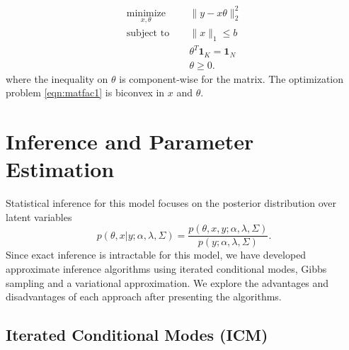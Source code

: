 \documentclass[11pt]{amsart}
\begin{document}
\begin{equation}\label{eqn:matfac1}
\begin{split}
\underset{x,\theta}{\text{minimize}} & \quad\ \| y - x\theta \|_2^2\\
\text{subject to} & \quad\ \|x\|_1 \leq b\\
& \quad\  \theta^T \mathbf{1}_K=\mathbf{1}_N\\
& \quad\  \theta \geq 0.
\end{split}
\end{equation}
where the inequality on $\theta$ is component-wise for the matrix. The optimization problem \eqref{eqn:matfac1} is biconvex in $x$ and $\theta$.



\section{Inference and Parameter Estimation}

Statistical inference for this model focuses on the  posterior distribution over latent variables
\begin{equation}
p(\theta, x | y; \alpha, \lambda, \Sigma) = \frac{ p(\theta, x, y; \alpha, \lambda, \Sigma) } { p(y; \alpha, \lambda, \Sigma) }.
\end{equation}
Since exact inference is intractable for this model, we have developed approximate inference algorithms using iterated conditional modes, Gibbs sampling and a variational approximation. We explore the advantages and disadvantages of each approach after presenting the algorithms.

\subsection{Iterated Conditional Modes (ICM)}
\end{document}

